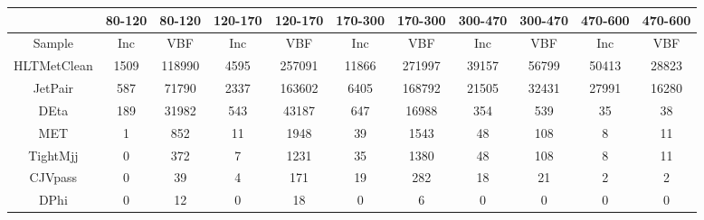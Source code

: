 
\begin{tabular}{|c||cc||cc||cc||cc||cc|}
\hline
 & 80-120 & 80-120 & 120-170 & 120-170 & 170-300 & 170-300 & 300-470 & 300-470 & 470-600 & 470-600 \\
\hline
Sample & Inc & VBF & Inc & VBF & Inc & VBF & Inc & VBF & Inc & VBF \\
\hline \hline
HLTMetClean & 1509 & 118990 & 4595 & 257091 & 11866 & 271997 & 39157 & 56799 & 50413 & 28823 \\
JetPair & 587 & 71790 & 2337 & 163602 & 6405 & 168792 & 21505 & 32431 & 27991 & 16280 \\
DEta & 189 & 31982 & 543 & 43187 & 647 & 16988 & 354 & 539 & 35 & 38 \\
MET & 1 & 852 & 11 & 1948 & 39 & 1543 & 48 & 108 & 8 & 11 \\
TightMjj & 0 & 372 & 7 & 1231 & 35 & 1380 & 48 & 108 & 8 & 11 \\
CJVpass & 0 & 39 & 4 & 171 & 19 & 282 & 18 & 21 & 2 & 2 \\
DPhi & 0 & 12 & 0 & 18 & 0 & 6 & 0 & 0 & 0 & 0 \\
\hline
\end{tabular}

